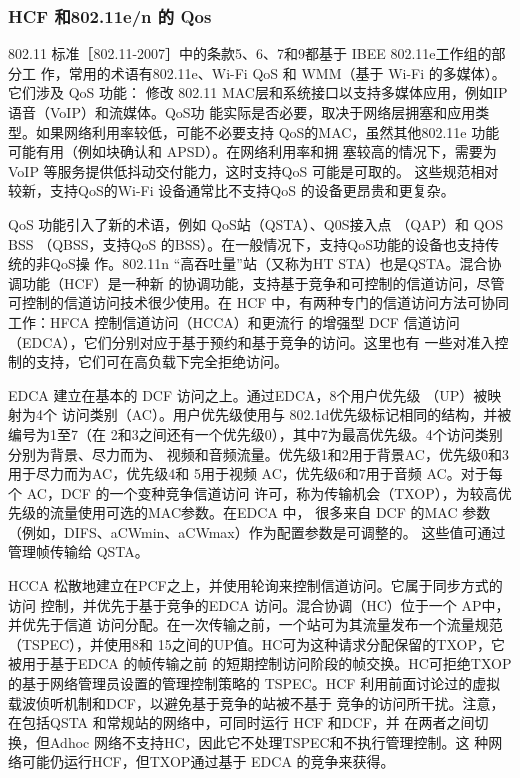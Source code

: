 \subsubsection{HCF 和802.11e/n 的 Qos}

802.11 标准［802.11-2007］中的条款5、6、7和9都基于 IBEE 802.11e工作组的部分工
作，常用的术语有802.11e、Wi-Fi QoS 和 WMM（基于 Wi-Fi 的多媒体）。它们涉及 QoS 功能：
修改 802.11 MAC层和系统接口以支持多媒体应用，例如IP 语音（VoIP）和流媒体。QoS功
能实际是否必要，取决于网络层拥塞和应用类型。如果网络利用率较低，可能不必要支持
QoS的MAC，虽然其他802.11e 功能可能有用（例如块确认和 APSD）。在网络利用率和拥
塞较高的情况下，需要为VoIP 等服务提供低抖动交付能力，这时支持QoS 可能是可取的。
这些规范相对较新，支持QoS的Wi-Fi 设备通常比不支持QoS 的设备更昂贵和更复杂。

QoS 功能引入了新的术语，例如 QoS站（QSTA）、Q0S接入点 （QAP）和 QOS BSS
（QBSS，支持QoS 的BSS）。在一般情况下，支持QoS功能的设备也支持传统的非QoS操
作。802.11n “高吞吐量”站（又称为HT STA）也是QSTA。混合协调功能（HCF）是一种新
的协调功能，支持基于竞争和可控制的信道访问，尽管可控制的信道访问技术很少使用。在
HCF 中，有两种专门的信道访问方法可协同工作：HFCA 控制信道访问（HCCA）和更流行
的增强型 DCF 信道访问（EDCA），它们分别对应于基于预约和基于竞争的访问。这里也有
一些对准入控制的支持，它们可在高负载下完全拒绝访问。

EDCA 建立在基本的 DCF 访问之上。通过EDCA，8个用户优先级 （UP）被映射为4个
访问类别（AC）。用户优先级使用与 802.1d优先级标记相同的结构，并被编号为1至7（在
2和3之间还有一个优先级0），其中7为最高优先级。4个访问类别分别为背景、尽力而为、
视频和音频流量。优先级1和2用于背景AC，优先级0和3用于尽力而为AC，优先级4和
5用于视频 AC，优先级6和7用于音频 AC。对于每个 AC，DCF 的一个变种竞争信道访问
许可，称为传输机会（TXOP），为较高优先级的流量使用可选的MAC参数。在EDCA 中，
很多来自 DCF 的MAC 参数（例如，DIFS、aCWmin、aCWmax）作为配置参数是可调整的。
这些值可通过管理帧传输给 QSTA。

HCCA 松散地建立在PCF之上，并使用轮询来控制信道访问。它属于同步方式的访问
控制，并优先于基于竞争的EDCA 访问。混合协调（HC）位于一个 AP中，并优先于信道
访问分配。在一次传输之前，一个站可为其流量发布一个流量规范（TSPEC），并使用8和
15之间的UP值。HC可为这种请求分配保留的TXOP，它被用于基于EDCA 的帧传输之前
的短期控制访问阶段的帧交换。HC可拒绝TXOP的基于网络管理员设置的管理控制策略的
TSPEC。HCF 利用前面讨论过的虚拟载波侦听机制和DCF，以避免基于竞争的站被不基于
竞争的访问所干扰。注意，在包括QSTA 和常规站的网络中，可同时运行 HCF 和DCF，并
在两者之间切换，但Adhoc 网络不支持HC，因此它不处理TSPEC和不执行管理控制。这
种网络可能仍运行HCF，但TXOP通过基于 EDCA 的竞争来获得。

